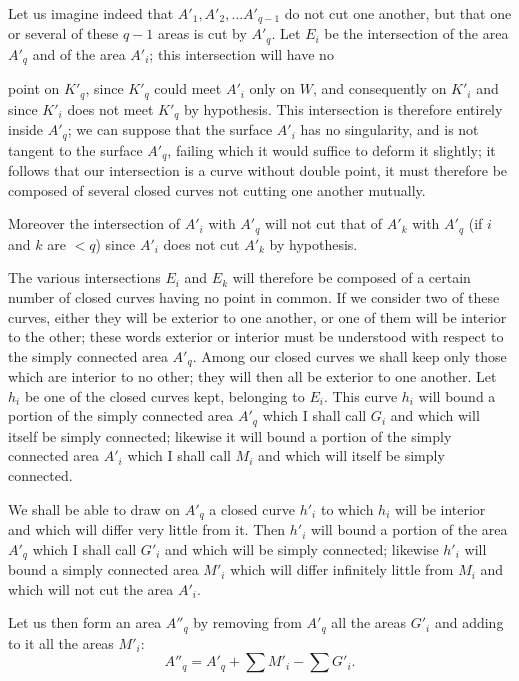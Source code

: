 \documentclass{article}
\begin{document}
Let us imagine indeed that $A'_{1}, A'_{2}, \ldots A'_{q-1}$ do not cut one another, but that one or several of these $q - 1$ areas is cut by $A'_{q}$. Let $E_{i}$ be the intersection of the area $A'_{q}$ and of the area $A'_{i}$; this intersection will have no

point on $K'_{q}$, since $K'_{q}$ could meet $A'_{i}$ only on $W$, and consequently on $K'_{i}$ and since $K'_{i}$ does not meet $K'_{q}$ by hypothesis. This intersection is therefore entirely inside $A'_{q}$; we can suppose that the surface $A'_{i}$ has no singularity, and is not tangent to the surface $A'_{q}$, failing which it would suffice to deform it slightly; it follows that our intersection is a curve without double point, it must therefore be composed of several closed curves not cutting one another mutually.

Moreover the intersection of $A'_{i}$ with $A'_{q}$ will not cut that of $A'_{k}$ with $A'_{q}$ (if $i$ and $k$ are $< q$) since $A'_{i}$ does not cut $A'_{k}$ by hypothesis.

The various intersections $E_{i}$ and $E_{k}$ will therefore be composed of a certain number of closed curves having no point in common. If we consider two of these curves, either they will be exterior to one another, or one of them will be interior to the other; these words exterior or interior must be understood with respect to the simply connected area $A'_{q}$. Among our closed curves we shall keep only those which are interior to no other; they will then all be exterior to one another. Let $h_{i}$ be one of the closed curves kept, belonging to $E_{i}$. This curve $h_{i}$ will bound a portion of the simply connected area $A'_{q}$ which I shall call $G_{i}$ and which will itself be simply connected; likewise it will bound a portion of the simply connected area $A'_{i}$ which I shall call $M_{i}$ and which will itself be simply connected.

We shall be able to draw on $A'_{q}$ a closed curve $h'_{i}$ to which $h_{i}$ will be interior and which will differ very little from it. Then $h'_{i}$ will bound a portion of the area $A'_{q}$ which I shall call $G'_{i}$ and which will be simply connected; likewise $h'_{i}$ will bound a simply connected area $M'_{i}$ which will differ infinitely little from $M_{i}$ and which will not cut the area $A'_{i}$.

Let us then form an area $A''_{q}$ by removing from $A'_{q}$ all the areas $G'_{i}$ and adding to it all the areas $M'_{i}$:
\[ A''_{q} = A'_{q} + \sum M'_{i} - \sum G'_{i}. \]
\end{document}
